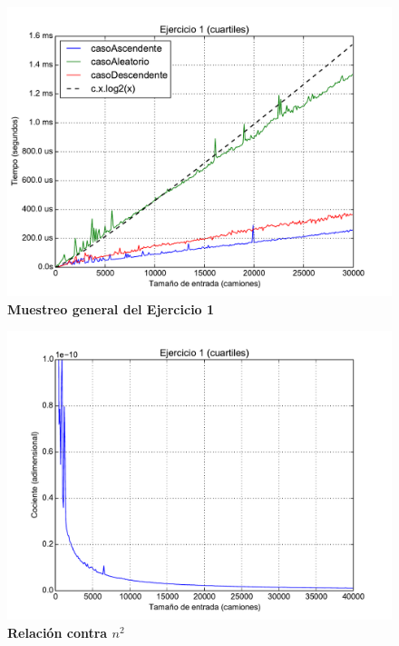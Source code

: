\documentclass[11pt, a4paper, twoside]{article}
\begin{document}
\clearpage
\begin{figure}[H]
   \begin{center}
   \includegraphics[width=1.4\textwidth,angle=90]{../ej1/graficos/test_1.pdf}
   \caption{\textbf{Muestreo general del Ejercicio 1}}
   \label{fig:ej1-1}
   \end{center}
\end{figure}

\clearpage
\begin{figure}[H]
   \begin{center}
   \includegraphics[width=1.4\textwidth,angle=90]{../ej1/graficos/test_2.pdf}
   \caption{\textbf{Relación contra $n^{2}$}}
   \label{fig:ej1-2}
   \end{center}
\end{figure}
\end{document}
